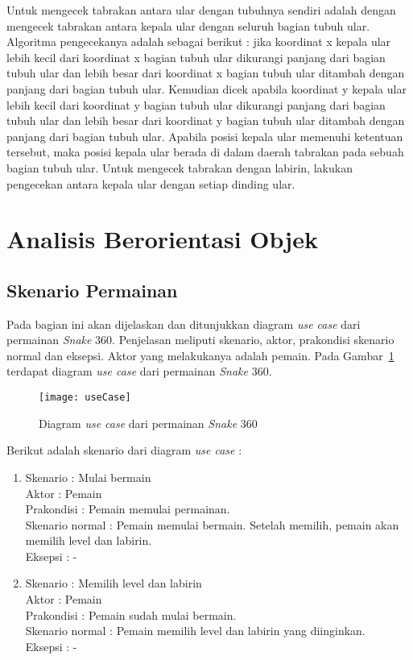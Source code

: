 Untuk mengecek tabrakan antara ular dengan tubuhnya sendiri adalah dengan mengecek tabrakan antara kepala ular dengan seluruh bagian tubuh ular. Algoritma pengecekanya adalah sebagai berikut : jika koordinat x kepala ular lebih kecil dari koordinat x bagian tubuh ular dikurangi panjang dari bagian tubuh ular dan lebih besar dari koordinat x bagian tubuh ular ditambah dengan panjang dari bagian tubuh ular. Kemudian dicek apabila koordinat y kepala ular lebih kecil dari koordinat y bagian tubuh ular dikurangi panjang dari bagian tubuh ular dan lebih besar dari koordinat y bagian tubuh ular ditambah dengan panjang dari bagian tubuh ular. Apabila posisi kepala ular memenuhi ketentuan tersebut, maka posisi kepala ular berada di dalam daerah tabrakan pada sebuah bagian tubuh ular. Untuk mengecek tabrakan dengan labirin, lakukan pengecekan antara kepala ular dengan setiap dinding ular. \\

\section{Analisis Berorientasi Objek}

\subsection{Skenario Permainan}
Pada bagian ini akan dijelaskan dan ditunjukkan diagram \textit{use case} dari permainan \textit{Snake} 360. Penjelasan meliputi skenario, aktor, prakondisi skenario normal dan eksepsi. Aktor yang melakukanya adalah pemain. Pada Gambar~\ref{fig:useCase} terdapat diagram \textit{use case} dari permainan \textit{Snake} 360.

\begin{figure}[H]
	\centering  
	\texttt{[image: useCase]}  
	\caption[Diagram \textit{use case} dari permainan \textit{Snake} 360]{Diagram \textit{use case} dari permainan \textit{Snake} 360}
	\label{fig:useCase} 
\end{figure}

Berikut adalah skenario dari diagram \textit{use case} :

\begin{enumerate}
	\item Skenario : Mulai bermain \\
Aktor : Pemain \\
Prakondisi : Pemain memulai permainan.\\
Skenario normal : Pemain memulai bermain. Setelah memilih, pemain akan memilih level dan labirin. \\
Eksepsi : - \\

	\item Skenario : Memilih level dan labirin \\
Aktor : Pemain \\
Prakondisi : Pemain sudah mulai bermain. \\
Skenario normal : Pemain memilih level dan labirin yang diinginkan. \\ 
Eksepsi : - \\
\end{enumerate}


